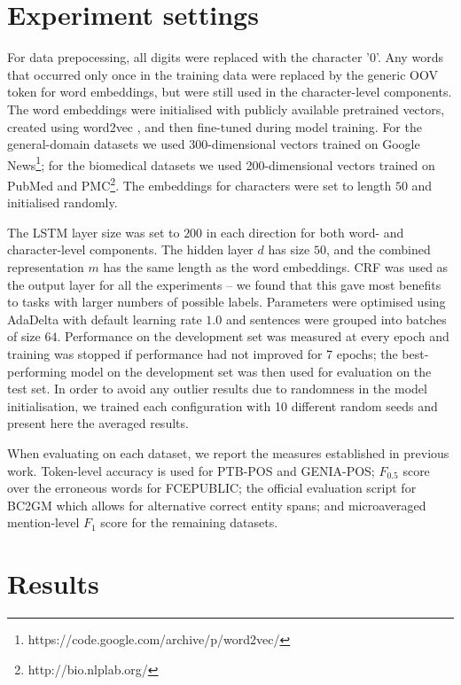 \documentclass[11pt]{article}
\begin{document}
\section{Experiment settings}
\label{sec:evaluation}

For data prepocessing, all digits were replaced with the character '0'. Any words that occurred only once in the training data were replaced by the generic OOV token for word embeddings, but were still used in the character-level components. 
The word embeddings were initialised with publicly available pretrained vectors, created using word2vec \cite{Mikolov2013a}, and then fine-tuned during model training. For the general-domain datasets we used 300-dimensional vectors trained on Google News\footnote{https://code.google.com/archive/p/word2vec/}; for the biomedical datasets we used 200-dimensional vectors trained on PubMed and PMC\footnote{http://bio.nlplab.org/}. The embeddings for characters were set to length $50$ and initialised randomly.

The LSTM layer size was set to $200$ in each direction for both word- and character-level components.
The hidden layer $d$ has size $50$, and the combined representation $m$ has the same length as the word embeddings.
CRF was used as the output layer for all the experiments -- we found that this gave most benefits to tasks with larger numbers of possible labels.
Parameters were optimised using AdaDelta \cite{Zeiler2012} with default learning rate $1.0$ and sentences were grouped into batches of size $64$. 
Performance on the development set was measured at every epoch and training was stopped if performance had not improved for 7 epochs; the best-performing model on the development set was then used for evaluation on the test set.
In order to avoid any outlier results due to randomness in the model initialisation, we trained each configuration with 10 different random seeds and present here the averaged results.

When evaluating on each dataset, we report the measures established in previous work.
Token-level accuracy is used for PTB-POS and GENIA-POS; $F_{0.5}$ score over the erroneous words for FCEPUBLIC; the official evaluation script for BC2GM which allows for alternative correct entity spans; and microaveraged mention-level $F_{1}$ score for the remaining datasets.

\section{Results}
\label{sec:results}
\end{document}
